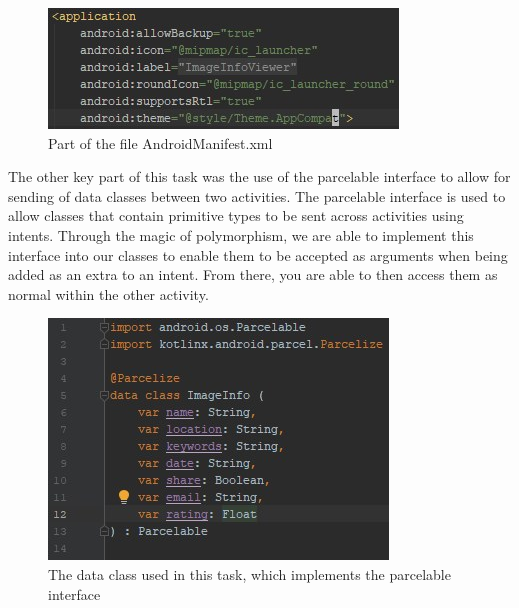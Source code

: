 \documentclass{scrartcl}
\begin{document}
\begin{figure}[h]
    \centering
    \includegraphics{images/styles.jpg}
    \caption{Part of the file AndroidManifest.xml}
\end{figure}

\pagebreak

The other key part of this task was the use of the parcelable interface to allow for sending of
data classes between two activities. The parcelable interface is used to allow classes that contain
primitive types to be sent across activities using intents. Through the magic of polymorphism, we
are able to implement this interface into our classes to enable them to be accepted as arguments when
being added as an extra to an intent. From there, you are able to then access them as normal within
the other activity.

\begin{figure}[h]
    \centering
    \includegraphics{images/parcelableclass.jpg}
    \caption{The data class used in this task, which implements the parcelable interface}
\end{figure}
\end{document}
